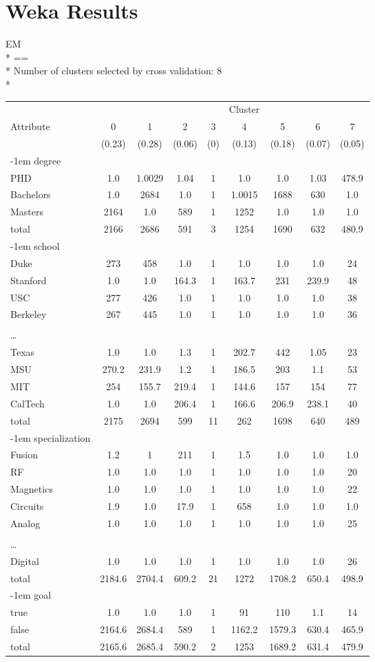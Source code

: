 \section{Weka Results}
\label{sect:weka-results}
\pagebreak 
\noindent EM\\*
\noindent ==\\*
\noindent Number of clusters selected by cross validation: 8\\*                           
\begin{tabular}{lcccccccc} 
&&&&&Cluster\\
Attribute&0&1&2&3&4&5&6&7\\
&(0.23)&(0.28)&(0.06)&(0)&(0.13)&(0.18)&(0.07)&(0.05)\\
\kern-1em degree\\
PHD&1.0&1.0029&1.04&1&1.0&1.0&1.03&478.9\\
Bachelors&1.0&2684&1.0&1&1.0015&1688&630&1.0\\
Masters&2164&1.0&589&1&1252&1.0&1.0&1.0\\
total&2166&2686&591&3&1254&1690&632&480.9\\
\kern-1em school\\
Duke&273&458&1.0&1&1.0&1.0&1.0&24\\
Stanford&1.0&1.0&164.3&1&163.7&231&239.9&48\\
USC&277&426&1.0&1&1.0&1.0&1.0&38\\
Berkeley&267&445&1.0&1&1.0&1.0&1.0&36\\
\\ \ldots\\
Texas&1.0&1.0&1.3&1&202.7&442&1.05&23\\ 
MSU&270.2&231.9&1.2&1&186.5&203&1.1&53\\
MIT&254&155.7&219.4&1&144.6&157&154&77\\
CalTech&1.0&1.0&206.4&1&166.6&206.9&238.1&40\\ 
total&2175&2694&599&11&262&1698&640&489\\
\kern-1em specialization\\ 
Fusion&1.2&1&211&1&1.5&1.0&1.0&1.0\\ 
RF&1.0&1.0&1.0&1&1.0&1.0&1.0&20\\ 
Magnetics&1.0&1.0&1.0&1&1.0&1.0&1.0&22\\
Circuits&1.9&1.0&17.9&1&658&1.0&1.0&1.0\\
Analog&1.0&1.0&1.0&1&1.0&1.0&1.0&25\\ 
\\ \ldots \\
Digital&1.0&1.0&1.0&1&1.0&1.0&1.0&26\\
total&2184.6&2704.4&609.2&21&1272&1708.2&650.4&498.9\\
\kern-1em goal\\ 
true&1.0&1.0&1.0&1&91&110&1.1&14\\
false&2164.6&2684.4&589&1&1162.2&1579.3&630.4&465.9\\ 
total&2165.6&2685.4&590.2&2&1253&1689.2&631.4&479.9\\
\end{tabular}
